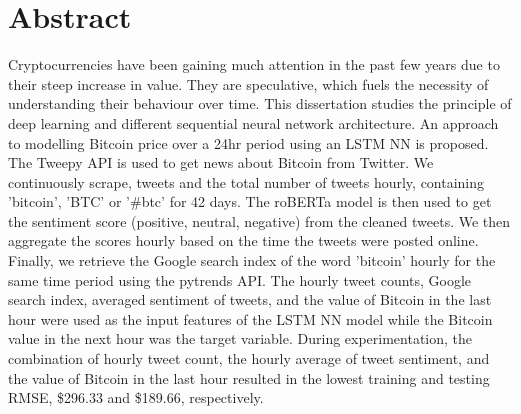 \documentclass[a4paper,12pt,hidelinks]{report}
\begin{document}
\chapter*{Abstract}
Cryptocurrencies have been gaining much attention in the past few years due to their steep increase in value. They are speculative, which fuels the necessity of understanding their behaviour over time. This dissertation studies the principle of deep learning and different sequential neural network architecture. An approach to modelling Bitcoin price over a 24hr period using an LSTM NN is proposed. The Tweepy API is used to get news about Bitcoin from Twitter. We continuously scrape, tweets and the total number of tweets hourly, containing 'bitcoin', 'BTC' or '\#btc' for 42 days. The roBERTa model is then used to get the sentiment score (positive, neutral, negative) from the cleaned tweets. We then aggregate the scores hourly based on the time the tweets were posted online. Finally, we retrieve the Google search index of the word 'bitcoin' hourly for the same time period using the pytrends API. The hourly tweet counts, Google search index, averaged sentiment of tweets, and the value of Bitcoin in the last hour were used as the input features of the LSTM NN model while the Bitcoin value in the next hour was the target variable. During experimentation, the combination of hourly tweet count, the hourly average of tweet sentiment, and the value of Bitcoin in the last hour resulted in the lowest training and testing RMSE, \$296.33 and \$189.66, respectively.






\end{document}
